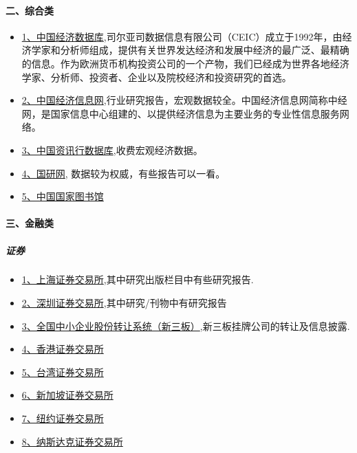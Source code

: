 \documentclass[letterpaper,10pt,english]{sphinxmanual}
\begin{document}
\paragraph{二、综合类}
\label{opendatasource:}\label{opendatasource:id6}\begin{itemize}
\item {} 
\href{http://www.ceicdata.com/zh-hans/countries/china}{1、中国经济数据库},司尔亚司数据信息有限公司（CEIC）成立于1992年，由经济学家和分析师组成，提供有关世界发达经济和发展中经济的最广泛、最精确的信息。作为欧洲货币机构投资公司的一个产物，我们已经成为世界各地经济学家、分析师、投资者、企业以及院校经济和投资研究的首选。

\item {} 
\href{http://www.cei.gov.cn}{2、中国经济信息网},行业研究报告，宏观数据较全。中国经济信息网简称中经网，是国家信息中心组建的、以提供经济信息为主要业务的专业性信息服务网络。

\item {} 
\href{http://www.bjinfobank.com/indexShow.do?method=index}{3、中国资讯行数据库},收费宏观经济数据。

\item {} 
\href{http://fjgyw.fjinfo.gov.cn/DRCNet.OLAP.BI/web/default.aspx}{4、国研网}, 数据较为权威，有些报告可以一看。

\item {} 
\href{http://www.nlc.gov.cn/}{5、中国国家图书馆}

\end{itemize}


\paragraph{三、金融类}
\label{opendatasource:}\label{opendatasource:id7}

\subparagraph{证券}
\label{opendatasource:}\label{opendatasource:id8}\begin{itemize}
\item {} 
\href{http://www.sse.com.cn/}{1、上海证券交易所},其中研究出版栏目中有些研究报告.

\item {} 
\href{http://www.szse.cn/}{2、深圳证券交易所},其中研究/刊物中有研究报告

\item {} 
\href{http://www.neeq.com.cn/}{3、全国中小企业股份转让系统（新三板）},新三板挂牌公司的转让及信息披露.

\item {} 
\href{http://www.hkexnews.hk/index\_c.htm}{4、香港证券交易所}

\item {} 
\href{http://www.tse.com.tw/ch/index.php}{5、台湾证券交易所}

\item {} 
\href{http://www.sgx.com/}{6、新加坡证券交易所}

\item {} 
\href{http://www.nyse.com}{7、纽约证券交易所}

\item {} 
\href{http://www.nasdaq.com}{8、纳斯达克证券交易所}

\end{itemize}
\end{document}

